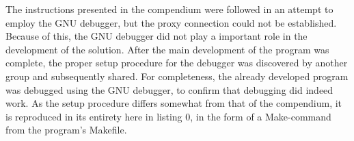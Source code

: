 The instructions presented in the compendium were followed in an attempt to employ the GNU debugger, but the proxy connection could not be established.
Because of this, the GNU debugger did not play a important role in the development of the solution.
After the main development of the program was complete, the proper setup procedure for the debugger was discovered by another group and subsequently shared.
For completeness, the already developed program was debugged using the GNU debugger, to confirm that debugging did indeed work.
As the setup procedure differs somewhat from that of the compendium, it is reproduced in its entirety here in listing 0, in the form of a Make-command from the program's Makefile.

